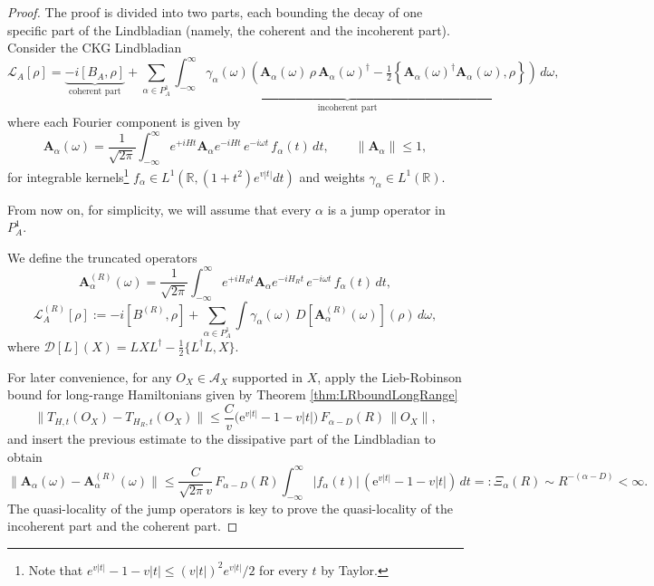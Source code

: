 \documentclass[11pt]{article}
\numberwithin{equation}{section}
\numberwithin{figure}{section}
\numberwithin{table}{section}
\theoremstyle{definition}
\theoremstyle{plain}
\theoremstyle{remark}
\newcommand{\A}{\mathcal{A}}
\newcommand{\vA}{\bm{A}}
\newcommand{\abs}[1]{\left \vert#1\right\vert}
\begin{document}
\begin{proof}
The proof is divided into two parts, each bounding the decay of one specific part of the Lindbladian (namely, the coherent and the incoherent part). Consider the CKG Lindbladian
\begin{equation}
\label{eq:L-CKG}
\mathcal L_A[\rho]
=
\underbrace{-i[B_A,\rho]}_{\text{coherent part}}
+
\underbrace{\sum_{\alpha\in P^1_A}
\int_{-\infty}^{\infty}\!\gamma_\alpha(\omega)
\left(
\vA_\alpha(\omega)\,\rho\,\vA_\alpha(\omega)^\dagger
-\tfrac12\!\left\{\vA_\alpha(\omega)^\dagger\vA_\alpha(\omega),\rho\right\}
\right)\,d\omega}_{\text{incoherent part}},
\end{equation}
where each Fourier component is given by
\begin{equation}
\label{eq:Ahat}
\vA_\alpha(\omega)
=
\frac{1}{\sqrt{2\pi}}
\int_{-\infty}^{\infty}
e^{+iHt}\vA_\alpha e^{-iHt}\,e^{-i\omega t}\,f_\alpha(t)\,dt,
\qquad 
\| \vA_\alpha\|\le 1,
\end{equation}
for integrable kernels\footnote{Note that $e^{v\abs{t}}-1-v\abs{t}\leq (v\abs{t})^2e^{v\abs{t}}/2$ for every $t$ by Taylor.} $f_\alpha\in L^1(\mathbb R,(1+t^2)e^{v|t|}dt)$ 
and weights $\gamma_\alpha\in L^1(\mathbb R)$.

From now on, for simplicity, we will assume that every $\alpha$ is a jump operator in $P_A^1$.

We define the truncated operators
\[
\vA^{(R)}_\alpha(\omega)
=
\frac{1}{\sqrt{2\pi}}
\int_{-\infty}^{\infty}
e^{+iH_Rt}\vA_\alpha e^{-iH_Rt}\,e^{-i\omega t}\,f_\alpha(t)\,dt,
\]\[
\mathcal L_A^{(R)}[\rho]
:=
-i[B^{(R)},\rho]
+\sum_{\alpha\in P_A^1}\!\int\!\gamma_\alpha(\omega)
\mathcal \,D[\vA^{(R)}_\alpha(\omega)](\rho)\,d\omega,
\]
where $\mathcal D[L](X)=LXL^\dagger-\tfrac12\{L^\dagger L,X\}$.

For later convenience, for any $O_X\in\A_X$ supported in $X$, apply the Lieb-Robinson bound for long-range Hamiltonians given by Theorem \ref{thm:LRboundLongRange}
\[
\|T_{H,t}(O_X)-T_{H_R,t}(O_X)\|
\le
\frac{C}{v}\big(\mathrm{e}^{v|t|}-1-v|t|\big)
\,F_{\alpha-D}(R)\,\|O_X\|,
\]
and insert the previous estimate to the dissipative part of the Lindbladian to obtain
\[
\|\vA_\alpha(\omega)-\vA^{(R)}_\alpha(\omega)\|
\le
\frac{C}{\sqrt{2\pi}v}\,
F_{\alpha-D}(R)
\int_{-\infty}^{\infty}\!|f_\alpha(t)|\,
(\mathrm{e}^{v|t|}-1-v|t|)\,dt=:\Xi_\alpha(R)
\sim R^{-(\alpha-D)}<\infty.
\]
The quasi-locality of the jump operators is key to prove the quasi-locality of the incoherent part and the coherent part.



\end{proof}
\end{document}
